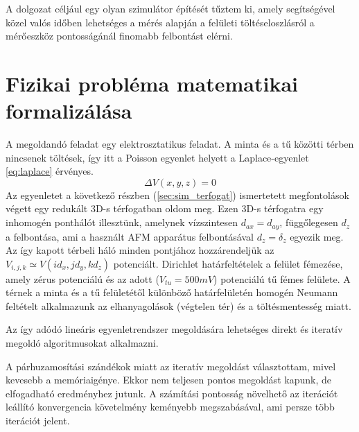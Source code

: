 	\noindent
	A dolgozat céljául egy olyan szimulátor építését tűztem ki, amely segítségével közel valós időben 
	lehetséges a mérés alapján a felületi töltéseloszlásról a mérőeszköz pontosságánál finomabb felbontást elérni.
	
	
	
\section{Fizikai probléma matematikai formalizálása}
	
	A megoldandó feladat egy elektrosztatikus feladat.
	A minta és a tű közötti térben nincsenek töltések, így itt a Poisson egyenlet helyett a
	Laplace-egyenlet \ref{eq:laplace} érvényes.
	\begin{equation}\label{eq:laplace}
		\Delta V(x,y,z) = 0 
	\end{equation}
	Az egyenletet a következő részben (\ref{sec:sim_terfogat}) ismertetett  megfontolások végett egy redukált
	3D-s térfogatban oldom meg.
	Ezen 3D-s térfogatra egy inhomogén ponthálót illesztünk, amelynek vízszintesen $d_{ax} = d_{ay}$,
	függőlegesen $d_z$ a felbontása, ami a használt AFM apparátus felbontásával $d_z = \delta_z$ egyezik meg.
	Az így kapott térbeli háló minden pontjához hozzárendeljük az $V_{i,j,k} \simeq V(id_x,jd_y,kd_z)$
	potenciált.
	Dirichlet határfeltételek a felület fémezése, amely zérus potenciálú és az adott ($V_{tu} = 500mV$)
	potenciálú  tű fémes felülete.
	A térnek a minta és a tű felületétől különböző határfelületén homogén Neumann feltételt alkalmazunk
	az elhanyagolások (végtelen tér) és a töltésmentesség miatt.
	
	Az így adódó lineáris egyenletrendszer megoldására lehetséges direkt és iteratív megoldó
	algoritmusokat alkalmazni.
	
	A párhuzamosítási szándékok miatt az iteratív megoldást választottam, mivel kevesebb a memóriaigénye.
	Ekkor nem teljesen pontos megoldást kapunk, de elfogadható eredményhez jutunk.
	A számítási pontosság növelhető az iterációt leállító konvergencia követelmény keményebb
	megszabásával, ami persze több iterációt jelent.
	
